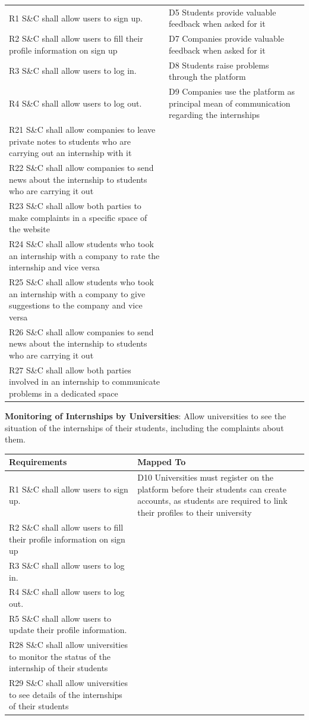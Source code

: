 \begin{enumerate}[label={[G\arabic*]}]
\begin{longtable}{|p{8cm}|p{8cm}|}
\hline
\endlastfoot
R1 S\&C shall allow users to sign up. &  D5 Students provide valuable feedback when asked for it \\
R2 S\&C shall allow users to fill their profile information on sign up & D7 Companies provide valuable feedback when asked for it \\
R3 S\&C shall allow users to log in. & D8 Students raise problems through the platform \\
R4 S\&C shall allow users to log out. &  D9 Companies use the platform as principal mean of communication regarding the internships \\
R21 S\&C shall allow companies to leave private notes to students who are carrying out an internship with it & \\
R22 S\&C shall allow companies to send news about the internship to students who are carrying it out &  \\
R23 S\&C shall allow both parties to make complaints in a specific space of the website & \\
R24 S\&C shall allow students who took an internship with a company to rate the internship and vice versa &  \\
R25 S\&C shall allow students who took an internship with a company to give suggestions to the company and vice versa & \\
R26 S\&C shall allow companies to send news about the internship to students who are carrying it out & \\
R27 S\&C shall allow both parties involved in an internship to communicate problems in a dedicated space & \\
\end{longtable}
\item \textbf{Monitoring of Internships by Universities}: 
    Allow universities to see the situation of the internships of their students, including the complaints about them.

\begin{longtable}{|p{8cm}|p{8cm}|}
\hline
\rowcolor[HTML]{CFE2F3} 
\textbf{Requirements} & \textbf{Mapped To} \\
\hline
\endfirsthead

\hline
\endfoot

\hline
\endlastfoot
R1 S\&C shall allow users to sign up. & D10 Universities must register on the platform before their students can create accounts, as students are required to link their profiles to their university \\
R2 S\&C shall allow users to fill their profile information on sign up & \\
R3 S\&C shall allow users to log in. &  \\
R4 S\&C shall allow users to log out. & \\
R5 S\&C shall allow users to update their profile information. & \\
R28 S\&C shall allow universities to monitor the status of the internship of their students &  \\ 
R29 S\&C shall allow universities to see details of the internships of their students & \\


\end{longtable}
\end{enumerate}
